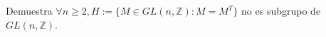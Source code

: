 \question
Demuestra $\forall {n \ge 2},H:=\{M\in GL(n,\mathbb{Z}):M=M^T\}$ no es subgrupo de $GL(n,\mathbb{Z})$.